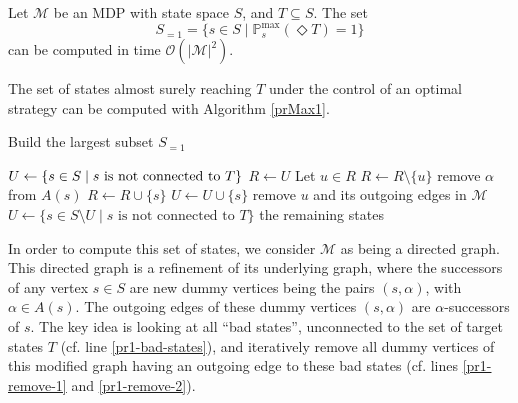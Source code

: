 \begin{theorem}
  Let $\mathcal{M}$ be an MDP with state space $S$, and $T \subseteq S$.
  The set
  \[
    S_{=1} = \{ s \in S \; | \; \mathbb{P}^{\max}_s(\Diamond T) = 1 \}
  \]
  can be computed in time $\mathcal{O}(|\mathcal{M}|^2)$.
\end{theorem}
The set of states almost surely reaching $T$ under the control of an optimal strategy can be computed with Algorithm \ref{prMax1}.
\begin{algorithm}[H]
\caption{Build the largest subset $S_{=1}$}
\label{prMax1}
\begin{algorithmic}[1]
\STATE $U \gets \{ s \in S \; | \; s \text{ is not connected
to } T\}$ \label{pr1-bad-states}
 \label{under-loop}
	\STATE $R \gets U$
		\STATE Let $u \in R$
		\STATE $R \gets R \setminus \{u \}$
		 \label{pr1-remove-1}
			\STATE remove $\alpha$ from $A(s)$
			 \label{pr1-remove-2}
			 \label{pr1-remove-3}
				\STATE $R \gets R \cup \{s\}$
				\STATE $U \gets U \cup \{s\}$ \label{pr1-remove-4}
			\ENDIF
		\ENDFOR
		\STATE remove $u$ and its outgoing edges in $\mathcal{M}$
	\ENDWHILE
	\STATE $U \gets \{ s \in S \setminus U \; | \; s \text{ is not connected to } T \}$ \label{pr1-unconnected}
\ENDWHILE
\RETURN the remaining states
\end{algorithmic}
\end{algorithm}
In order to compute this set of states, we consider $\mathcal{M}$ as being a directed graph.
This directed graph is a refinement of its underlying graph, where the successors of any vertex $s \in S$ are new dummy vertices being the pairs $(s, \alpha)$, with $\alpha \in A(s)$.
The outgoing edges of these dummy vertices $(s, \alpha)$ are $\alpha$-successors of $s$.
The key idea is looking at all ``bad states'', unconnected to the set of target states $T$ (cf. line \ref{pr1-bad-states}), and iteratively remove all dummy vertices of this modified graph having an outgoing edge to these bad states (cf. lines \ref{pr1-remove-1} and \ref{pr1-remove-2}).
